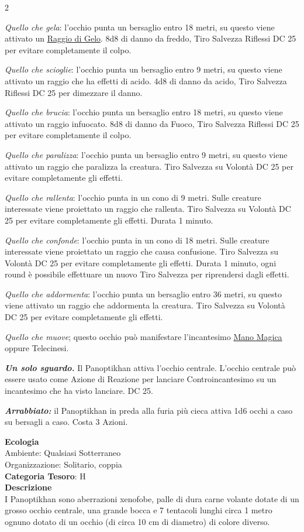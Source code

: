 \begin{multicols}{2}
{\emph{Quello che gela}: l'occhio punta un bersaglio entro 18 metri, su questo viene attivato un \hyperlink{Raggio di Gelo}{Raggio di Gelo}. 8d8 di danno da freddo, Tiro Salvezza Riflessi DC 25 per evitare completamente il colpo.

\emph{Quello che scioglie}: l'occhio punta un bersaglio entro 9 metri, su questo viene attivato un raggio che ha effetti di acido. 4d8 di danno da acido, Tiro Salvezza Riflessi DC 25 per dimezzare il danno.

\emph{Quello che brucia}: l'occhio punta un bersaglio entro 18 metri, su questo viene attivato un raggio infuocato. 8d8 di danno da Fuoco, Tiro Salvezza Riflessi DC 25 per evitare completamente il colpo.

\emph{Quello che paralizza}: l'occhio punta un bersaglio entro 9 metri, su questo viene attivato un raggio che paralizza la creatura. Tiro Salvezza su Volontà DC 25 per evitare completamente gli effetti.

\emph{Quello che rallenta}: l'occhio punta in un cono di 9 metri. Sulle creature interessate viene proiettato un raggio che rallenta. Tiro Salvezza su Volontà DC 25 per evitare completamente gli effetti. Durata 1 minuto.

\emph{Quello che confonde}: l'occhio punta in un cono di 18 metri. Sulle creature interessate viene proiettato un raggio che causa confusione. Tiro Salvezza su Volontà DC 25 per evitare completamente gli effetti. Durata 1 minuto, ogni round è possibile effettuare un nuovo Tiro Salvezza per riprendersi dagli effetti.

\emph{Quello che addormenta}: l'occhio punta un bersaglio entro 36 metri, su questo viene attivato un raggio che addormenta la creatura. Tiro Salvezza su Volontà DC 25 per evitare completamente gli effetti.

\emph{Quello che muove}; questo occhio può manifestare l'incantesimo \hyperlink{Mano Magica}{Mano Magica} oppure Telecinesi.

\emph{\textbf{Un solo sguardo.}} Il Panoptikhan attiva l'occhio centrale. L'occhio centrale può essere usato come Azione di Reazione per lanciare Controincantesimo su un incantesimo che ha visto lanciare. DC 25.

\emph{\textbf{Arrabbiato:}} il Panoptikhan in preda alla furia più cieca attiva 1d6 occhi a caso su bersagli a caso. Costa 3 Azioni.

\textbf{Ecologia}\\
Ambiente: Qualsiasi Sotterraneo\\
Organizzazione: Solitario, coppia\\
\textbf{Categoria Tesoro}: H\\
\textbf{Descrizione}\\
I Panoptikhan sono aberrazioni xenofobe, palle di dura carne volante dotate di un grosso occhio centrale, una grande bocca e 7 tentacoli lunghi circa 1 metro ognuno dotato di un occhio (di circa 10 cm di diametro) di colore diverso.

}
\end{multicols}
